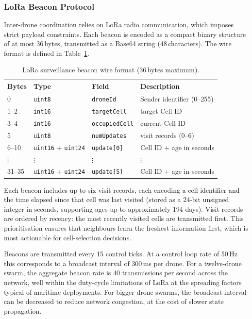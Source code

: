 \subsubsection{LoRa Beacon Protocol}

Inter-drone coordination relies on LoRa radio communication, which imposes strict payload constraints. Each beacon is encoded as a compact binary structure of at most 36\,bytes, transmitted as a Base64 string (48\,characters). The wire format is defined in Table~\ref{tab:lora_beacon}.

\begin{table}[h]
\centering
\caption{LoRa surveillance beacon wire format (36\,bytes maximum).}
\label{tab:lora_beacon}
\begin{tabular}{llll}
\hline
\textbf{Bytes} & \textbf{Type} & \textbf{Field} & \textbf{Description} \\
\hline
0       & \texttt{uint8}  & \texttt{droneId}      & Sender identifier (0--255) \\
1--2    & \texttt{int16}  & \texttt{targetCell}   & target Cell ID  \\
3--4    & \texttt{int16}  & \texttt{occupiedCell} & current Cell ID \\
5       & \texttt{uint8}  & \texttt{numUpdates}   & visit records (0--6) \\
6--10   & \texttt{uint16} + \texttt{uint24} & \texttt{update[0]} & Cell ID + age in seconds \\
$\vdots$ & $\vdots$ & $\vdots$ & $\vdots$ \\
31--35  & \texttt{uint16} + \texttt{uint24} & \texttt{update[5]} & Cell ID + age in seconds \\
\hline
\end{tabular}
\end{table}

Each beacon includes up to six visit records, each encoding a cell identifier and the time elapsed since that cell was last visited (stored as a 24-bit unsigned integer in seconds, supporting ages up to approximately 194 days). Visit records are ordered by recency: the most recently visited cells are transmitted first. This prioritisation ensures that neighbours learn the freshest information first, which is most actionable for cell-selection decisions.

Beacons are transmitted every 15 control ticks. At a control loop rate of 50\,Hz this corresponds to a broadcast interval of 300\,ms per drone. For a twelve-drone swarm, the aggregate beacon rate is 40 transmissions per second across the network, well within the duty-cycle limitations of LoRa at the spreading factors typical of maritime deployments. For bigger drone swarms, the broadcast interval can be decreased to reduce network congestion, at the cost of slower state propagation.

